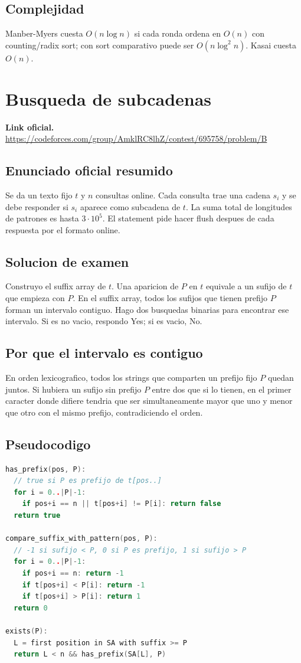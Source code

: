 \documentclass[10pt]{article}
\newcommand{\bigO}{O}
\begin{document}
\subsection{Complejidad}
Manber-Myers cuesta $\bigO(n\log n)$ si cada ronda ordena en $\bigO(n)$ con
counting/radix sort; con sort comparativo puede ser $\bigO(n\log^2 n)$. Kasai
cuesta $\bigO(n)$.

\newpage

\section{Busqueda de subcadenas}
\textbf{Link oficial.} \url{https://codeforces.com/group/AmklRC8lhZ/contest/695758/problem/B}

\subsection{Enunciado oficial resumido}
Se da un texto fijo $t$ y $n$ consultas online. Cada consulta trae una cadena
$s_i$ y se debe responder si $s_i$ aparece como subcadena de $t$. La suma total
de longitudes de patrones es hasta $3\cdot 10^5$. El statement pide hacer flush
despues de cada respuesta por el formato online.

\subsection{Solucion de examen}
Construyo el suffix array de $t$. Una aparicion de $P$ en $t$ equivale a un
sufijo de $t$ que empieza con $P$. En el suffix array, todos los sufijos que
tienen prefijo $P$ forman un intervalo contiguo. Hago dos busquedas binarias
para encontrar ese intervalo. Si es no vacio, respondo Yes; si es vacio, No.

\subsection{Por que el intervalo es contiguo}
En orden lexicografico, todos los strings que comparten un prefijo fijo $P$
quedan juntos. Si hubiera un sufijo sin prefijo $P$ entre dos que si lo tienen,
en el primer caracter donde difiere tendria que ser simultaneamente mayor que
uno y menor que otro con el mismo prefijo, contradiciendo el orden.

\subsection{Pseudocodigo}
\begin{lstlisting}[language=C++]
has_prefix(pos, P):
  // true si P es prefijo de t[pos..]
  for i = 0..|P|-1:
    if pos+i == n || t[pos+i] != P[i]: return false
  return true

compare_suffix_with_pattern(pos, P):
  // -1 si sufijo < P, 0 si P es prefijo, 1 si sufijo > P
  for i = 0..|P|-1:
    if pos+i == n: return -1
    if t[pos+i] < P[i]: return -1
    if t[pos+i] > P[i]: return 1
  return 0

exists(P):
  L = first position in SA with suffix >= P
  return L < n && has_prefix(SA[L], P)
\end{lstlisting}
\end{document}
